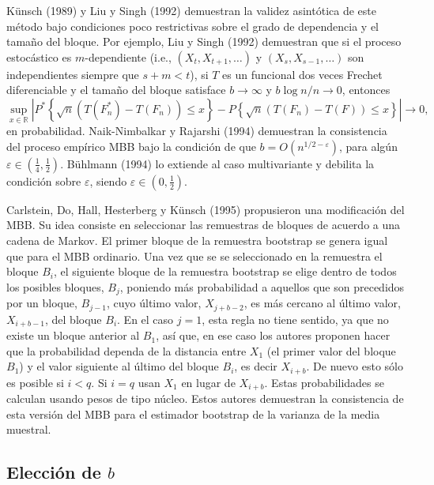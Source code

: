 \documentclass[]{book}
\theoremstyle{definition}
\theoremstyle{definition}
\theoremstyle{definition}
\theoremstyle{remark}
\begin{document}
Künsch (1989) y Liu y Singh (1992) demuestran la validez asintótica de
este método bajo condiciones poco restrictivas sobre el grado de
dependencia y el tamaño del bloque. Por ejemplo, Liu y Singh (1992)
demuestran que si el proceso estocástico es \(m\)-dependiente (i.e.,
\((X_{t},X_{t+1},\ldots )\) y \((X_{s},X_{s-1},\ldots )\) son
independientes siempre que \(s+m<t\)), si \(T\) es un funcional dos
veces Frechet diferenciable y el tamaño del bloque satisface
\(b\rightarrow \infty\) y \(b\log n/n\rightarrow 0\), entonces
\[\sup_{x\in \mathbb{R}}\left\vert P^{\ast}\left\{ \sqrt{n}\left(
T(F_n^{\ast})-T\left( F_n \right) \right) \leq x\right\} -P\left\{ \sqrt{
n}\left( T(F_n)-T\left( F \right) \right) \leq x\right\} \right\vert
\rightarrow 0\mathrm{,}\]en probabilidad. Naik-Nimbalkar y Rajarshi
(1994) demuestran la consistencia del proceso empírico MBB bajo la
condición de que \(b=O(n^{1/2-\varepsilon })\), para algún
\(\varepsilon \in (\frac{1}{4},\frac{1}{2})\). Bühlmann (1994) lo
extiende al caso multivariante y debilita la condición sobre
\(\varepsilon\), siendo \(\varepsilon \in (0,\frac{1}{2})\).

Carlstein, Do, Hall, Hesterberg y Künsch (1995) propusieron una
modificación del MBB. Su idea consiste en seleccionar las remuestras de
bloques de acuerdo a una cadena de Markov. El primer bloque de la
remuestra bootstrap se genera igual que para el MBB ordinario. Una vez
que se se seleccionado en la remuestra el bloque \(B_i\), el siguiente
bloque de la remuestra bootstrap se elige dentro de todos los posibles
bloques, \(B_j\), poniendo más probabilidad a aquellos que son
precedidos por un bloque, \(B_{j-1}\), cuyo último valor, \(X_{j+b-2}\),
es más cercano al último valor, \(X_{i+b-1}\), del bloque \(B_i\). En el
caso \(j=1\), esta regla no tiene sentido, ya que no existe un bloque
anterior al \(B_1\), así que, en ese caso los autores proponen hacer que
la probabilidad dependa de la distancia entre \(X_1\) (el primer valor
del bloque \(B_1\)) y el valor siguiente al último del bloque \(B_i\),
es decir \(X_{i+b}\). De nuevo esto sólo es posible si \(i<q\). Si
\(i=q\) usan \(X_1\) en lugar de \(X_{i+b}\). Estas probabilidades se
calculan usando pesos de tipo núcleo. Estos autores demuestran la
consistencia de esta versión del MBB para el estimador bootstrap de la
varianza de la media muestral.

\subsection{\texorpdfstring{Elección de
\(b\)}{Elección de b}}\label{eleccion-de-b}
\end{document}
